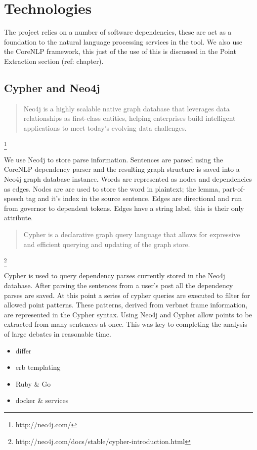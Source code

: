 \chapter{Technologies\label{chap:technologies}}
  The project relies on a number of software dependencies, these are act as a foundation to the natural language processing services in the tool. We also use the CoreNLP framework, this just of the use of this is discussed in the Point Extraction section (ref: chapter).

  \section{Cypher and Neo4j}
    \blockquote{Neo4j is a highly scalable native graph database that leverages data relationships as first-class entities, helping enterprises build intelligent applications to meet today's evolving data challenges.} \footnote{http://neo4j.com/}

    We use Neo4j to store parse information. Sentences are parsed using the CoreNLP dependency parser and the resulting graph structure is saved into a Neo4j graph database instance. Words are represented as nodes and dependencies as edges. Nodes are are used to store the word in plaintext; the lemma, part-of-speech tag and it's index in the source sentence. Edges are directional and run from governor to dependent tokens. Edges have a string label, this is their only attribute.

    \blockquote{Cypher is a declarative graph query language that allows for expressive and efficient querying and updating of the graph store.} \footnote{http://neo4j.com/docs/stable/cypher-introduction.html}

    Cypher is used to query dependency parses currently stored in the Neo4j database. After parsing the sentences from a user's post all the dependency parses are saved. At this point a series of cypher queries are executed to filter for allowed point patterns. These patterns, derived from verbnet frame information, are represented in the Cypher syntax. Using Neo4j and Cypher allow points to be extracted from many sentences at once. This was key to completing the analysis of large debates in reasonable time.

  \begin{itemize}
    \item{differ}
    \item{erb templating}
    \item{Ruby \& Go}
    \item{docker \& services}
  \end{itemize}
